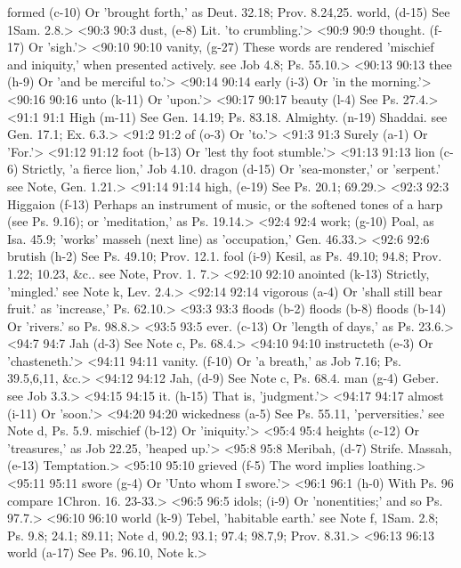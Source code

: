   formed (c-10)  Or 'brought forth,' as Deut. 32.18; Prov. 8.24,25.
  world, (d-15)  See 1Sam. 2.8.>
<90:3 90:3  dust, (e-8)  Lit. 'to crumbling.'>
<90:9 90:9  thought. (f-17)  Or 'sigh.'>
<90:10 90:10  vanity, (g-27)  These words are rendered 'mischief and iniquity,' when  presented actively. see Job 4.8; Ps. 55.10.>
<90:13 90:13  thee (h-9)  Or 'and be merciful to.'>
<90:14 90:14  early (i-3)  Or 'in the morning.'>
<90:16 90:16  unto (k-11)  Or 'upon.'>
<90:17 90:17  beauty (l-4)  See Ps. 27.4.>
<91:1 91:1  High (m-11)  See Gen. 14.19; Ps. 83.18.
  Almighty. (n-19)  Shaddai. see Gen. 17.1; Ex. 6.3.>
<91:2 91:2  of (o-3)  Or 'to.'>
<91:3 91:3  Surely (a-1)  Or 'For.'>
<91:12 91:12  foot (b-13)  Or 'lest thy foot stumble.'>
<91:13 91:13  lion (c-6)  Strictly, 'a fierce lion,' Job 4.10.
  dragon (d-15)  Or 'sea-monster,' or 'serpent.' see Note, Gen. 1.21.>
<91:14 91:14  high, (e-19)  See Ps. 20.1; 69.29.>
<92:3 92:3  Higgaion (f-13)  Perhaps an instrument of music, or the softened tones of a  harp (see Ps. 9.16); or 'meditation,' as Ps. 19.14.>
<92:4 92:4  work; (g-10)  Poal, as Isa. 45.9; 'works' masseh (next line) as  'occupation,' Gen. 46.33.>
<92:6 92:6  brutish (h-2)  See Ps. 49.10; Prov. 12.1.
  fool (i-9)  Kesil, as Ps. 49.10; 94.8; Prov. 1.22; 10.23, &c.. see  Note, Prov. 1. 7.>
<92:10 92:10  anointed (k-13)  Strictly, 'mingled.' see Note k, Lev. 2.4.>
<92:14 92:14  vigorous (a-4)  Or 'shall still bear fruit.' as 'increase,' Ps. 62.10.>
<93:3 93:3  floods (b-2)  floods (b-8)  floods (b-14)
  Or 'rivers.' so Ps. 98.8.>
<93:5 93:5  ever. (c-13)  Or 'length of days,' as Ps. 23.6.>
<94:7 94:7  Jah (d-3) See Note c, Ps. 68.4.>
<94:10 94:10  instructeth (e-3)  Or 'chasteneth.'>
<94:11 94:11  vanity. (f-10)  Or 'a breath,' as Job 7.16; Ps. 39.5,6,11, &c.>
<94:12 94:12  Jah, (d-9)  See Note c, Ps. 68.4.
  man (g-4)  Geber. see Job 3.3.>
<94:15 94:15  it. (h-15)  That is, 'judgment.'>
<94:17 94:17  almost (i-11)  Or 'soon.'>
<94:20 94:20  wickedness (a-5)  See Ps. 55.11, 'perversities.' see Note d, Ps. 5.9.
  mischief (b-12)  Or 'iniquity.'>
<95:4 95:4  heights (c-12)  Or 'treasures,' as Job 22.25, 'heaped up.'>
<95:8 95:8  Meribah, (d-7)  Strife.
  Massah, (e-13)  Temptation.>
<95:10 95:10  grieved (f-5)  The word implies loathing.>
<95:11 95:11  swore (g-4)  Or 'Unto whom I swore.'>
<96:1 96:1   (h-0)  With Ps. 96 compare 1Chron. 16. 23-33.>
<96:5 96:5  idols; (i-9)  Or 'nonentities;' and so Ps. 97.7.>
<96:10 96:10  world (k-9)  Tebel, 'habitable earth.' see Note f, 1Sam. 2.8; Ps. 9.8;  24.1; 89.11; Note d, 90.2; 93.1; 97.4; 98.7,9; Prov. 8.31.>
<96:13 96:13  world (a-17)  See Ps. 96.10, Note k.>
